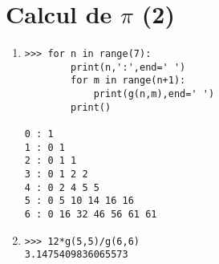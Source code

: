 \documentclass[11pt,a4paper]{article}
\begin{document}
\section{Calcul de $\pi$ (2)}
%

\begin{minipage}[t]{7cm}
\begin{enumerate}
\item 
\begin{Verbatim}
>>> for n in range(7):
        print(n,':',end=' ')
        for m in range(n+1):
            print(g(n,m),end=' ')
        print()

0 : 1 
1 : 0 1 
2 : 0 1 1 
3 : 0 1 2 2 
4 : 0 2 4 5 5 
5 : 0 5 10 14 16 16 
6 : 0 16 32 46 56 61 61 
\end{Verbatim}
\end{enumerate}
\end{minipage}
\hfill
\begin{minipage}[t]{7cm}
\begin{enumerate}\setcounter{enumi}{1}
\item  
\begin{Verbatim}
>>> 12*g(5,5)/g(6,6)
3.1475409836065573

\end{Verbatim}
\end{enumerate}
\end{minipage}


\label{fini}
\end{document}
